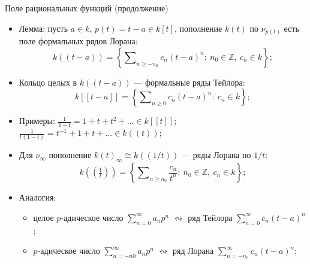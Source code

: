 \documentclass[serif, aspectratio=169]{beamer}
\begin{document}
\begin{frame}{Поле рациональных функций (продолжение)}
    \begin{itemize}
        \item Лемма: пусть $a\in k$, $p(t)=t-a \in k[t]$, пополнение $k(t)$ по $\nu_{p(t)}$ есть поле формальных рядов Лорана:
        \[k((t-a))=\left\{\sum\nolimits_{n\geqslant -n_0} c_n (t-a)^n:\ n_0\in\mathbb{Z},\ c_n\in k\right\};\]
        \item Кольцо целых в $k((t-a))$ --- формальные ряды Тейлора:
        \[k[[t-a]]=\left\{\sum\nolimits_{n\geqslant0}c_n (t-a)^n:\ c_n\in k\right\};\] 
        \item Примеры: $\frac{1}{1-t}=1+t+t^2+\dots\in k[[t]]$; $\tfrac{1}{t(1-t)}=t^{-1}+1+t+\dots\in k((t))$;
        \item Для $\nu_\infty$ пополнение $k(t)_\infty\cong k((1/t))$ --- ряды Лорана по $1/t$:
        \[k\left(\left(\tfrac{1}{t}\right)\right)=\left\{\sum\nolimits_{n\geqslant n_0} \frac{c_n}{t^n}:\ n_0\in\mathbb{Z},\ c_n\in k\right\};\]
        
        \item Аналогия: 
        \begin{itemize}
            \item целое $p$-адическое число $\sum_{n=0}^\infty a_n p^n$ $\leftrightsquigarrow$ ряд Тейлора $\sum_{n=0}^\infty c_n (t-a)^n$; 
            \item $p$-адическое число $\sum_{n=-n0}^\infty a_n p^n$ $\leftrightsquigarrow$ ряд Лорана $\sum_{n=-n_0}^\infty c_n (t-a)^n$; 
        \end{itemize}
        
    \end{itemize}

    \note{
        \begin{itemize}
            \item ---
        \end{itemize}
    }
\end{frame}
\end{document}
